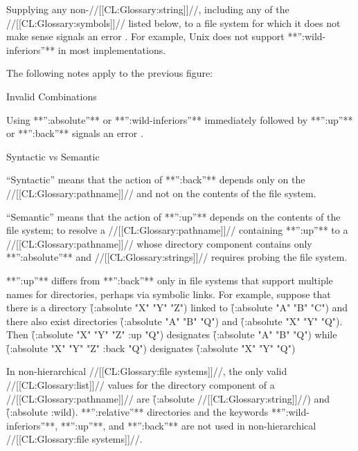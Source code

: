 Supplying any non-//[[CL:Glossary:string]]//, including any of the //[[CL:Glossary:symbols]]// listed below,  to a file system for which it does not make sense signals an error . For example, Unix does not support **'':wild-inferiors''** in most implementations.

The following notes apply to the previous figure:

\beginlist \item{Invalid Combinations}

Using **'':absolute''** or **'':wild-inferiors''**  immediately followed by **'':up''** or **'':back''** signals an error .
  \item{Syntactic vs Semantic}

``Syntactic'' means that the action of **'':back''**  depends only on the //[[CL:Glossary:pathname]]// and not on the contents of the file system.  

``Semantic'' means that the action of **'':up''**  depends on the contents of the file system;  to resolve a //[[CL:Glossary:pathname]]// containing  **'':up''** to a //[[CL:Glossary:pathname]]// whose directory component contains only **'':absolute''** and  //[[CL:Glossary:strings]]// requires probing the file system.

**'':up''** differs from  **'':back''** only in file systems that support multiple
  names for directories, perhaps via symbolic links.  For example,
  suppose that there is a directory \f{(:absolute "X" "Y" "Z")}
  linked to  \f{(:absolute "A" "B" "C")}
  and there also exist directories \f{(:absolute "A" "B" "Q")} and  \f{(:absolute "X" "Y" "Q")}. Then \f{(:absolute "X" "Y" "Z" :up "Q")}
  designates \f{(:absolute "A" "B" "Q")}
  while \f{(:absolute "X" "Y" "Z" :back "Q")}
  designates \f{(:absolute "X" "Y" "Q")} \endlist 


In non-hierarchical //[[CL:Glossary:file systems]]//, the only valid //[[CL:Glossary:list]]// values for the directory component of a //[[CL:Glossary:pathname]]// are \f{(:absolute //[[CL:Glossary:string]]//)} and \f{(:absolute :wild)}. **'':relative''** directories and the keywords **'':wild-inferiors''**, **'':up''**, and **'':back''** are not used  in non-hierarchical //[[CL:Glossary:file systems]]//.

